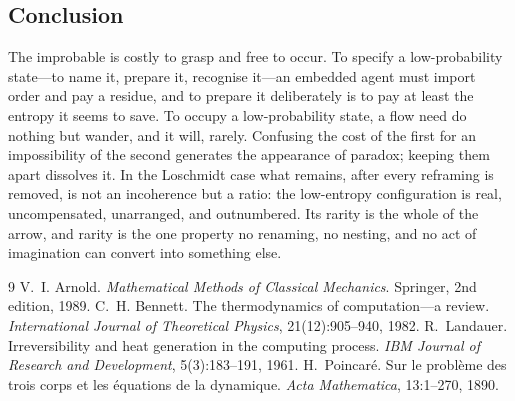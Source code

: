 \documentclass[11pt,a4paper]{article}
\theoremstyle{thmstyle}
\theoremstyle{definition}
\theoremstyle{remark}
\begin{document}
\subsection{Conclusion}

The improbable is costly to grasp and free to occur. To specify a
low-probability state---to name it, prepare it, recognise it---an embedded agent
must import order and pay a residue, and to prepare it deliberately is to pay at
least the entropy it seems to save. To occupy a low-probability state, a flow
need do nothing but wander, and it will, rarely. Confusing the cost of the first
for an impossibility of the second generates the appearance of paradox; keeping
them apart dissolves it. In the Loschmidt case what remains, after every
reframing is removed, is not an incoherence but a ratio: the low-entropy
configuration is real, uncompensated, unarranged, and outnumbered. Its rarity is
the whole of the arrow, and rarity is the one property no renaming, no nesting,
and no act of imagination can convert into something else.

\begin{thebibliography}{9}
 V.~I. Arnold.
\emph{Mathematical Methods of Classical Mechanics}. Springer, 2nd edition, 1989.
 C.~H. Bennett.
The thermodynamics of computation---a review.
\emph{International Journal of Theoretical Physics}, 21(12):905--940, 1982.
 R.~Landauer.
Irreversibility and heat generation in the computing process.
\emph{IBM Journal of Research and Development}, 5(3):183--191, 1961.
 H.~Poincar\'e.
Sur le probl\`eme des trois corps et les \'equations de la dynamique.
\emph{Acta Mathematica}, 13:1--270, 1890.
\end{thebibliography}
\end{document}
